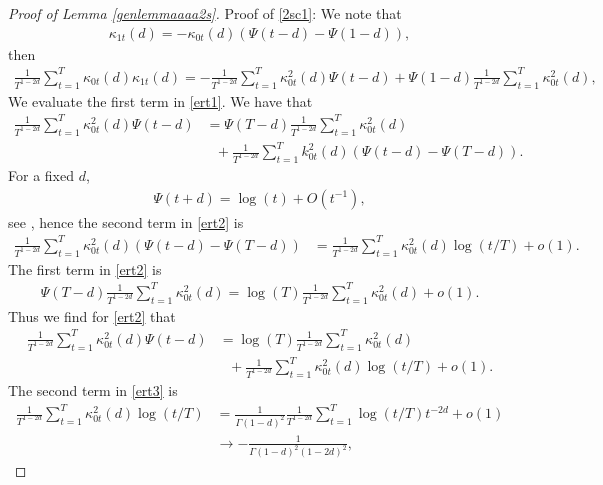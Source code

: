 {{\begin{proof}[Proof of Lemma \ref{genlemmaaaa2s}]
Proof of \eqref{2sc1}: We note that 
\begin{align*}
    \kappa_{1t}(d) = - \kappa_{0t}(d) \left( \Psi(t-d) - \Psi(1-d) \right),
\end{align*}
then 
\begin{align}
    \frac{1}{T^{1-2d} } \sum_{t = 1}^T \kappa_{0t}(d) \kappa_{1t}(d)  =  - \frac{1}{T^{1-2d} } \sum_{t = 1}^T \kappa^2_{0t}(d) \Psi(t-d) +  \Psi(1-d)\frac{1}{T^{1-2d} } \sum_{t = 1}^T \kappa^2_{0t}(d), \label{ert1}
\end{align}
We evaluate the first term in \eqref{ert1}. We have that 
\begin{align}
   \frac{1}{T^{1-2d} } \sum_{t = 1}^T \kappa^2_{0t}(d) \Psi(t-d) &= \Psi(T-d)   \frac{1}{T^{1-2d} }  \sum_{t = 1}^T \kappa^2_{0t}(d) \nonumber \\
   &\ \ \ +   \frac{1}{T^{1-2d} }  \sum_{t = 1}^T k^2_{0t}(d) \left(\Psi(t-d)-\Psi(T-d)\right). \label{ert2}
\end{align}
For a fixed $d$, 
\begin{align*}
    \Psi(t + d) = \log(t) + O(t^{-1}),
\end{align*}
see \textcite[eqn.\ 6.3.18]{abramowitz1964handbook}, hence the second term in \eqref{ert2} is 
\begin{align*}
\frac{1}{T^{1-2d} } \sum_{t = 1}^{T} \kappa^2_{0t}(d) \left(  \Psi(t-d) - \Psi(T-d) \right) &= \frac{1}{T^{1-2d} }\sum_{t = 1}^{T} \kappa^2_{0t}(d) \log(t/T) + o(1). 
\end{align*}
The first term in \eqref{ert2} is  
\begin{align*}
     \Psi(T-d) \frac{1}{T^{1-2d} }  \sum_{t = 1}^T \kappa^2_{0t}(d) = \log(T) \frac{1}{T^{1-2d} }  \sum_{t = 1}^T \kappa^2_{0t}(d)   + o(1).
\end{align*}
Thus we find for \eqref{ert2} that 
\begin{align}
   \frac{1}{T^{1-2d} } \sum_{t = 1}^T \kappa^2_{0t}(d) \Psi(t-d) &=  \log(T) \frac{1}{T^{1-2d} }  \sum_{t = 1}^T \kappa^2_{0t}(d) \nonumber \\
   &\ \ \ +   \frac{1}{T^{1-2d} }\sum_{t = 1}^{T} \kappa^2_{0t}(d) \log(t/T) + o(1).\label{ert3}
\end{align}
The second term in \eqref{ert3} is 
\begin{align*}
      \frac{1}{T^{1-2d}}\sum_{t = 1}^{T} \kappa^2_{0t}(d) \log(t/T) &= \frac{1}{\Gamma\left(1-d\right)^2} \frac{1}{T^{1-2d}} \sum_{t = 1}^T \log(t/T) t^{-2d} + o(1) \\
     &\rightarrow - \frac{1}{\Gamma(1-d)^2 (1-2d)^2},

\end{align*}
\end{proof}}}
